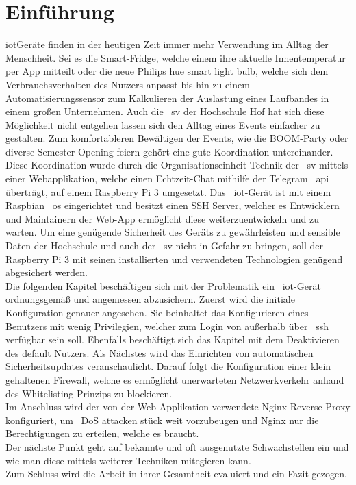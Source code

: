 
\section{Einführung}\label{sec:einfuhrung}
\gls{iot}Geräte finden in der heutigen Zeit immer mehr Verwendung im Alltag der Menschheit.
Sei es die Smart-Fridge, welche einem ihre aktuelle Innentemperatur per App mitteilt oder die neue Philips hue smart light bulb,
welche sich dem Verbrauchsverhalten des Nutzers anpasst bis hin zu einem Automatisierungssensor zum Kalkulieren der Auslastung eines Laufbandes in einem großen Unternehmen.
Auch die ~\gls{sv} der Hochschule Hof hat sich diese Möglichkeit nicht entgehen lassen sich den Alltag eines Events einfacher zu gestalten.
Zum komfortableren Bewältigen der Events, wie die BOOM-Party oder diverse Semester Opening feiern gehört eine gute Koordination untereinander.
Diese Koordination wurde durch die Organisationseinheit Technik der ~\gls{sv} mittels einer Webapplikation, welche einen Echtzeit-Chat mithilfe der Telegram ~\gls{api} überträgt, auf einem Raspberry Pi 3 umgesetzt.
Das ~\gls{iot}-Gerät ist mit einem Raspbian ~\gls{os} eingerichtet und besitzt einen SSH Server, welcher es Entwicklern und Maintainern der Web-App ermöglicht diese weiterzuentwickeln und zu warten.
Um eine genügende Sicherheit des Geräts zu gewährleisten und sensible Daten der Hochschule und auch der ~\gls{sv} nicht in Gefahr zu bringen, soll der Raspberry Pi 3 mit seinen installierten und verwendeten Technologien genügend
abgesichert werden.\\
\blankline
Die folgenden Kapitel beschäftigen sich mit der Problematik ein ~\gls{iot}-Gerät ordnungsgemäß und angemessen abzusichern.
Zuerst wird die initiale Konfiguration genauer angesehen.
Sie beinhaltet das Konfigurieren eines Benutzers mit wenig Privilegien, welcher zum Login von außerhalb über ~\gls{ssh} verfügbar sein soll.
Ebenfalls beschäftigt sich das Kapitel mit dem Deaktivieren des default Nutzers.
Als Nächstes wird das Einrichten von automatischen Sicherheitsupdates veranschaulicht.
Darauf folgt die Konfiguration einer klein gehaltenen Firewall, welche es ermöglicht unerwarteten Netzwerkverkehr anhand des Whitelisting-Prinzips zu blockieren.\\
Im Anschluss wird der von der Web-Applikation verwendete Nginx Reverse Proxy konfiguriert, um ~\gls{DoS} attacken stück weit vorzubeugen und Nginx nur die Berechtigungen zu erteilen, welche es braucht. \\
Der nächste Punkt geht auf bekannte und oft ausgenutzte Schwachstellen ein und wie man diese mittels weiterer Techniken mitegieren kann. \\
Zum Schluss wird die Arbeit in ihrer Gesamtheit evaluiert und ein Fazit gezogen.